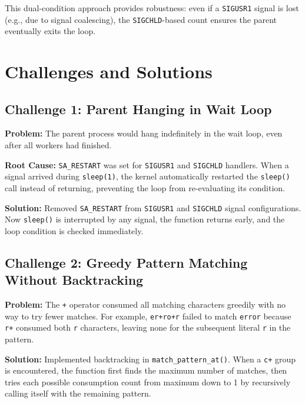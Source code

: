 \documentclass[12pt,a4paper]{article}
\begin{document}
This dual-condition approach provides robustness: even if a \texttt{SIGUSR1} signal is lost (e.g., due to signal coalescing), the \texttt{SIGCHLD}-based count ensures the parent eventually exits the loop.

\section{Challenges and Solutions}

\subsection{Challenge 1: Parent Hanging in Wait Loop}

\textbf{Problem:} The parent process would hang indefinitely in the wait loop, even after all workers had finished.

\textbf{Root Cause:} \texttt{SA\_RESTART} was set for \texttt{SIGUSR1} and \texttt{SIGCHLD} handlers. When a signal arrived during \texttt{sleep(1)}, the kernel automatically restarted the \texttt{sleep()} call instead of returning, preventing the loop from re-evaluating its condition.

\textbf{Solution:} Removed \texttt{SA\_RESTART} from \texttt{SIGUSR1} and \texttt{SIGCHLD} signal configurations. Now \texttt{sleep()} is interrupted by any signal, the function returns early, and the loop condition is checked immediately.

\subsection{Challenge 2: Greedy Pattern Matching Without Backtracking}

\textbf{Problem:} The \texttt{+} operator consumed all matching characters greedily with no way to try fewer matches. For example, \texttt{er+ro+r} failed to match \texttt{error} because \texttt{r+} consumed both \texttt{r} characters, leaving none for the subsequent literal \texttt{r} in the pattern.

\textbf{Solution:} Implemented backtracking in \texttt{match\_pattern\_at()}. When a \texttt{c+} group is encountered, the function first finds the maximum number of matches, then tries each possible consumption count from maximum down to 1 by recursively calling itself with the remaining pattern.
\end{document}
